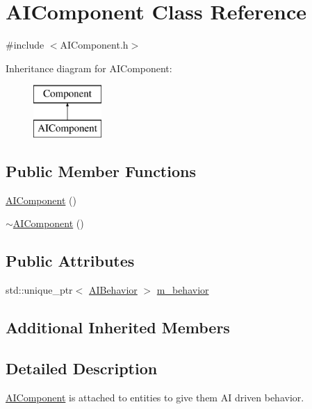 \hypertarget{class_a_i_component}{}\section{A\+I\+Component Class Reference}
\label{class_a_i_component}


{\ttfamily \#include $<$A\+I\+Component.\+h$>$}

Inheritance diagram for A\+I\+Component\+:\begin{figure}[H]
\begin{center}
\leavevmode
\includegraphics[height=2.000000cm]{class_a_i_component}
\end{center}
\end{figure}
\subsection*{Public Member Functions}
\begin{DoxyCompactItemize}
\item 
\mbox{\hyperlink{class_a_i_component_ac0e093b9d74e3a103d93d843a1795a95}{A\+I\+Component}} ()
\item 
\mbox{\hyperlink{class_a_i_component_a0ffc6db0d1cb5720b8aaef8ec28f4efe}{$\sim$\+A\+I\+Component}} ()
\end{DoxyCompactItemize}
\subsection*{Public Attributes}
\begin{DoxyCompactItemize}
\item 
std\+::unique\+\_\+ptr$<$ \mbox{\hyperlink{class_a_i_behavior}{A\+I\+Behavior}} $>$ \mbox{\hyperlink{class_a_i_component_a39ced78aec7dc4cce01017ad2dfb06ea}{m\+\_\+behavior}}
\end{DoxyCompactItemize}
\subsection*{Additional Inherited Members}


\subsection{Detailed Description}
\mbox{\hyperlink{class_a_i_component}{A\+I\+Component}} is attached to entities to give them AI driven behavior. 

